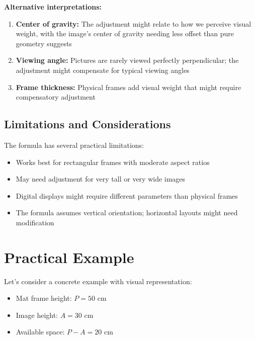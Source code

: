 \documentclass[12pt,a4paper]{article}
\begin{document}
\textbf{Alternative interpretations:}

\begin{enumerate}
    \item \textbf{Center of gravity:} The adjustment might relate to how we perceive visual weight, with the image's center of gravity needing less offset than pure geometry suggests

    \item \textbf{Viewing angle:} Pictures are rarely viewed perfectly perpendicular; the adjustment might compensate for typical viewing angles

    \item \textbf{Frame thickness:} Physical frames add visual weight that might require compensatory adjustment
\end{enumerate}

\subsection{Limitations and Considerations}

The formula has several practical limitations:

\begin{itemize}
    \item Works best for rectangular frames with moderate aspect ratios
    \item May need adjustment for very tall or very wide images
    \item Digital displays might require different parameters than physical frames
    \item The formula assumes vertical orientation; horizontal layouts might need modification
\end{itemize}

\section{Practical Example}

Let's consider a concrete example with visual representation:

\begin{itemize}
    \item Mat frame height: $P = 50$ cm
    \item Image height: $A = 30$ cm
    \item Available space: $P - A = 20$ cm
\end{itemize}
\end{document}
